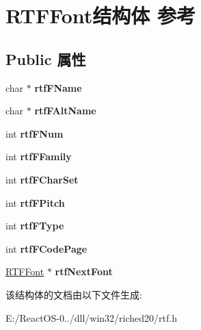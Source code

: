 \hypertarget{struct_r_t_f_font}{}\section{R\+T\+F\+Font结构体 参考}
\label{struct_r_t_f_font}
\subsection*{Public 属性}
\begin{DoxyCompactItemize}
\item 
\mbox{\label{struct_r_t_f_font_a7cc0e0db9427903b75fe890e6a2d32b9}} 
char $\ast$ {\bfseries rtf\+F\+Name}
\item 
\mbox{\label{struct_r_t_f_font_aef9515e0c53ca188f11203410193c1ee}} 
char $\ast$ {\bfseries rtf\+F\+Alt\+Name}
\item 
\mbox{\label{struct_r_t_f_font_a1cbc68b06569170b76b49cf7cf0e4887}} 
int {\bfseries rtf\+F\+Num}
\item 
\mbox{\label{struct_r_t_f_font_a54cd1aed151d847bc9fa9e6e88e042ec}} 
int {\bfseries rtf\+F\+Family}
\item 
\mbox{\label{struct_r_t_f_font_adaac889e2fd3ebab5c910e1a2b0f36ea}} 
int {\bfseries rtf\+F\+Char\+Set}
\item 
\mbox{\label{struct_r_t_f_font_a4a6c6172df7b39f25479207b17df656c}} 
int {\bfseries rtf\+F\+Pitch}
\item 
\mbox{\label{struct_r_t_f_font_a31ae4d0bba4f8abe3a1b943ab17b2155}} 
int {\bfseries rtf\+F\+Type}
\item 
\mbox{\label{struct_r_t_f_font_a8fae3b7d067e7a5b3615ce4ea9454e66}} 
int {\bfseries rtf\+F\+Code\+Page}
\item 
\mbox{\label{struct_r_t_f_font_a74566a0d9fcad8a56ef4f87c010e236b}} 
\hyperlink{struct_r_t_f_font}{R\+T\+F\+Font} $\ast$ {\bfseries rtf\+Next\+Font}
\end{DoxyCompactItemize}


该结构体的文档由以下文件生成\+:\begin{DoxyCompactItemize}
\item 
E\+:/\+React\+O\+S-\/0../dll/win32/riched20/rtf.\+h\end{DoxyCompactItemize}
